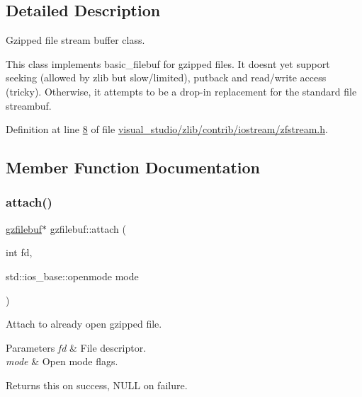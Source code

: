 \subsection{Detailed Description}
Gzipped file stream buffer class. 

This class implements basic\+\_\+filebuf for gzipped files. It doesn\textquotesingle{}t yet support seeking (allowed by zlib but slow/limited), putback and read/write access (tricky). Otherwise, it attempts to be a drop-\/in replacement for the standard file streambuf. 

Definition at line \hyperlink{visual__studio_2zlib_2contrib_2iostream_2zfstream_8h_source_l00008}{8} of file \hyperlink{visual__studio_2zlib_2contrib_2iostream_2zfstream_8h_source}{visual\+\_\+studio/zlib/contrib/iostream/zfstream.\+h}.



\subsection{Member Function Documentation}
\mbox{\label{classgzfilebuf_a72889233c00bfd297ca01723cc4ed8fc}} 
\subsubsection{\texorpdfstring{attach()}{attach()}\hspace{0.1cm}{\footnotesize\ttfamily [1/2]}}
{\footnotesize\ttfamily \hyperlink{classgzfilebuf}{gzfilebuf}$\ast$ gzfilebuf\+::attach (\begin{DoxyParamCaption}\item[{int}]{fd,  }\item[{std\+::ios\+\_\+base\+::openmode}]{mode }\end{DoxyParamCaption})}



Attach to already open gzipped file. 


\begin{DoxyParams}{Parameters}
{\em fd} & File descriptor. \\
\hline
{\em mode} & Open mode flags. \\
\hline
\end{DoxyParams}
\begin{DoxyReturn}{Returns}
{\ttfamily this} on success, N\+U\+LL on failure. 
\end{DoxyReturn}
\mbox{\label{classgzfilebuf_ae8a47750ca65bc2a43b4768b47f3923a}} 
